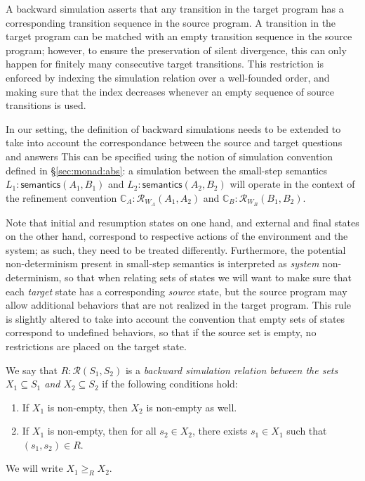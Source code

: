 \documentclass[acmsmall,timestamp,review,anonymous]{acmart}
\newcommand{\kw}[1]{\ensuremath{ \mathsf{#1} }}
\begin{document}
A backward simulation asserts that any transition in the target program
has a corresponding transition sequence in the source program.
A transition in the target program can be matched with
an empty transition sequence in the source program;
however, to ensure the preservation of silent divergence,
this can only happen for finitely many consecutive target transitions.
This restriction is enforced by indexing the simulation relation
over a well-founded order,
and making sure that the index decreases
whenever an empty sequence of source transitions is used.

In our setting,
the definition of backward simulations needs to be extended
to take into account the correspondance between
the source and target questions and answers
This can be specified using the notion of simulation convention
defined in \S\ref{sec:monad:abs}:
a simulation between the small-step semantics
$L_1 : \kw{semantics}(A_1, B_1)$ and
$L_2 : \kw{semantics}(A_2, B_2)$ will
operate in the context of the refinement convention
$\mathbb{C}_A : \mathcal{R}_{W_A}(A_1, A_2)$ and
$\mathbb{C}_B : \mathcal{R}_{W_B}(B_1, B_2)$.

Note that initial and resumption states on one hand,
and external and final states on the other hand,
correspond to respective actions of the environment and the system;
as such, they need to be treated differently.
Furthermore,
the potential non-determinism present in small-step semantics
is interpreted as \emph{system} non-determinism,
so that when relating sets of states
we will want to make sure that
each \emph{target} state has a corresponding \emph{source} state,
but the source program may allow additional behaviors
that are not realized in the target program.
This rule is slightly altered to take into account the convention that
empty sets of states correspond to undefined behaviors,
so that if the source set is empty,
no restrictions are placed on the target state.

\begin{definition}
We say that $R : \mathcal{R}(S_1, S_2)$ is a
\emph{backward simulation relation
  between the sets $X_1 \subseteq S_1$ and  $X_2 \subseteq S_2$}
if the following conditions hold:
\begin{enumerate}
\item
  If $X_1$ is non-empty,
  then $X_2$ is non-empty as well.
\item
  If $X_1$ is non-empty,
  then for all $s_2 \in X_2$,
  there exists $s_1 \in X_1$
  such that $(s_1, s_2) \in R$.
\end{enumerate}
We will write $X_1 \ge_R X_2$.
\end{definition}
\end{document}
